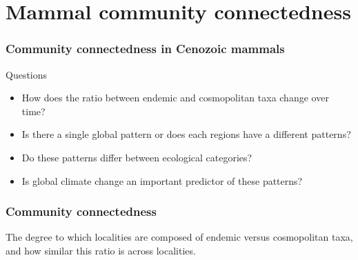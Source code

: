 \documentclass{beamer}
\begin{document}
\section{Mammal community connectedness}

\begin{frame}
  \frametitle{Community connectedness in Cenozoic mammals}

  \begin{block}{Questions}
    \begin{itemize}
      \item How does the ratio between endemic and cosmopolitan taxa change over time?
      \item Is there a single global pattern or does each regions have a different patterns?
      \item Do these patterns differ between ecological categories?
      \item Is global climate change an important predictor of these patterns?
    \end{itemize}
  \end{block}
\end{frame}

\begin{frame}
  \frametitle{Community connectedness}
  \begin{definition}
    The degree to which localities are composed of endemic versus cosmopolitan taxa, and how similar this ratio is across localities.
  \end{definition}
\end{frame}
\end{document}
